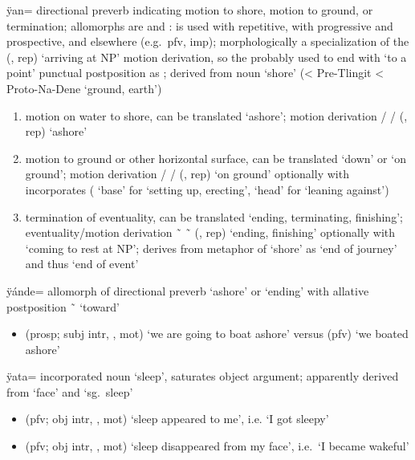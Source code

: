 \begin{morphdesc}[resume*=alphalist]
\item[ÿan=]
	directional preverb indicating motion to shore, motion to ground, or termination;
	allomorphs are  and :
		 is used with repetitive,
		 with progressive and prospective,
		and  elsewhere (e.g.\ pfv, imp);
	morphologically a specialization of the
		 (,  rep) ‘arriving at NP’
		motion derivation,
	so the  probably used to end with  ‘to a point’ punctual postposition
		as ;
	derived from noun  ‘shore’
		(< Pre-Tlingit  < Proto-Na-Dene  ‘ground, earth’)
	\begin{enumerate}
	\item	motion on water to shore,
		can be translated ‘ashore’;
		motion derivation
			 /  /  (,  rep) ‘ashore’
	\item	motion to ground or other horizontal surface,
		can be translated ‘down’ or ‘on ground’;
		motion derivation
			 /  /  (,  rep) ‘on ground’
			optionally with incorporates ( ‘base’ for ‘setting up, erecting’,
			 ‘head’ for ‘leaning against’)
	\item	termination of eventuality,
		can be translated ‘ending, terminating, finishing’;
		eventuality/motion derivation
			 \~\  \~\  (,  rep) ‘ending, finishing’
			optionally with  ‘coming to rest at NP’;
		derives from metaphor of ‘shore’ as ‘end of journey’ and thus ‘end of event’
	\end{enumerate}

\item[ÿánde=]
	allomorph of directional preverb  ‘ashore’ or ‘ending’
	with allative postposition  \~\  ‘toward’
	\begin{itemize}
	\item	{} (prosp; subj intr, , mot) ‘we are going to boat ashore’\newline
		versus  (pfv) ‘we boated ashore’
	\end{itemize}

\item[ÿata=]
	incorporated noun ‘sleep’,
	saturates object argument;
	apparently derived from  ‘face’ and  ‘sg.\ sleep’
	\begin{itemize}
	\item	{} (pfv; obj intr, , mot) ‘sleep appeared to me’, i.e. ‘I got sleepy’
	\item	{} (pfv; obj intr, , mot) ‘sleep disappeared from my face’,
		i.e.\ ‘I became wakeful’
	\end{itemize}


\end{morphdesc}
